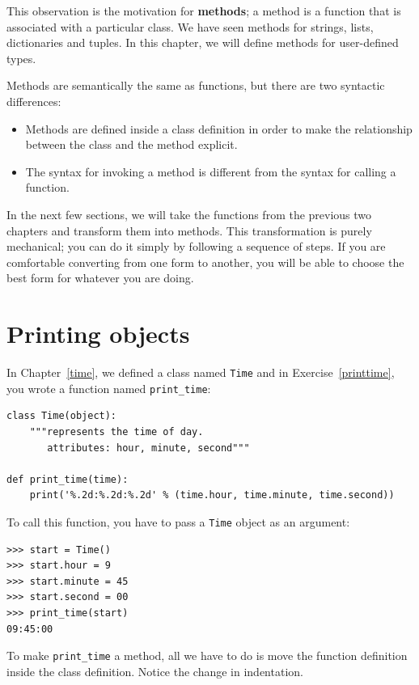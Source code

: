\documentclass[10pt]{book}
\begin{document}

This observation is the motivation for {\bf methods}; a method is
a function that is associated with a particular class.
We have seen methods for strings, lists, dictionaries and tuples.
In this chapter, we will define methods for user-defined types.


Methods are semantically the same as functions, but there are
two syntactic differences:

\begin{itemize}

\item Methods are defined inside a class definition in order
to make the relationship between the class and the method explicit.

\item The syntax for invoking a method is different from the
syntax for calling a function.

\end{itemize}

In the next few sections, we will take the functions from the previous
two chapters and transform them into methods.  This transformation is
purely mechanical; you can do it simply by following a sequence of
steps.  If you are comfortable converting from one form to another,
you will be able to choose the best form for whatever you are doing.


\section{Printing objects}
\label{print_time}


In Chapter~\ref{time}, we defined a class named
{\tt Time} and in Exercise~\ref{printtime}, you 
wrote a function named \verb"print_time":

\beforeverb
\begin{verbatim}
class Time(object):
    """represents the time of day.
       attributes: hour, minute, second"""

def print_time(time):
    print('%.2d:%.2d:%.2d' % (time.hour, time.minute, time.second))
\end{verbatim}
\afterverb
%
To call this function, you have to pass a {\tt Time} object as an
argument:

\beforeverb
\begin{verbatim}
>>> start = Time()
>>> start.hour = 9
>>> start.minute = 45
>>> start.second = 00
>>> print_time(start)
09:45:00
\end{verbatim}
\afterverb
%
To make \verb"print_time" a method, all we have to do is
move the function definition inside the class definition.  Notice
the change in indentation.
\end{document}
